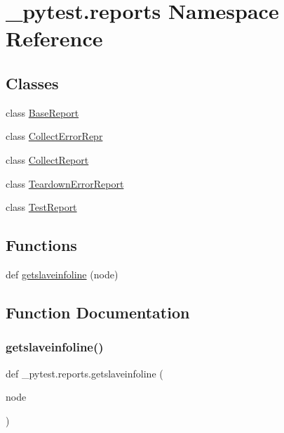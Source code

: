 \hypertarget{namespace__pytest_1_1reports}{}\section{\+\_\+pytest.\+reports Namespace Reference}
\label{namespace__pytest_1_1reports}
\subsection*{Classes}
\begin{DoxyCompactItemize}
\item 
class \hyperlink{class__pytest_1_1reports_1_1_base_report}{Base\+Report}
\item 
class \hyperlink{class__pytest_1_1reports_1_1_collect_error_repr}{Collect\+Error\+Repr}
\item 
class \hyperlink{class__pytest_1_1reports_1_1_collect_report}{Collect\+Report}
\item 
class \hyperlink{class__pytest_1_1reports_1_1_teardown_error_report}{Teardown\+Error\+Report}
\item 
class \hyperlink{class__pytest_1_1reports_1_1_test_report}{Test\+Report}
\end{DoxyCompactItemize}
\subsection*{Functions}
\begin{DoxyCompactItemize}
\item 
def \hyperlink{namespace__pytest_1_1reports_aacafacc4c9a4587e7983c417b07ce954}{getslaveinfoline} (node)
\end{DoxyCompactItemize}


\subsection{Function Documentation}
\mbox{\label{namespace__pytest_1_1reports_aacafacc4c9a4587e7983c417b07ce954}} 
\subsubsection{\texorpdfstring{getslaveinfoline()}{getslaveinfoline()}}
{\footnotesize\ttfamily def \+\_\+pytest.\+reports.\+getslaveinfoline (\begin{DoxyParamCaption}\item[{}]{node }\end{DoxyParamCaption})}


